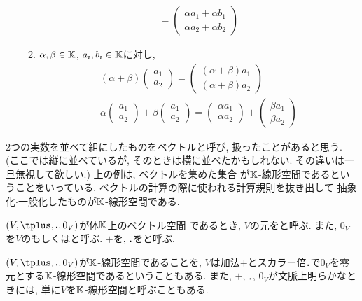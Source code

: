 \begin{example}
\begin{enumerate}
\begin{enumerate}
\begin{align*}
=\begin{pmatrix}\alpha a_1+\alpha b_1\\\alpha a_2+\alpha b_2\end{pmatrix}
\end{align*}
    \item
$\alpha,\beta\in\mathbb{K}$, $a_i,b_i\in\mathbb{K}$に対し,
    \begin{align*}
(\alpha+\beta)\begin{pmatrix}a_1\\a_2\end{pmatrix}
=\begin{pmatrix}(\alpha+\beta)a_1\\(\alpha+\beta)a_2\end{pmatrix}\\
\alpha\begin{pmatrix}a_1\\a_2\end{pmatrix}+\beta\begin{pmatrix}a_1\\a_2\end{pmatrix}
=\begin{pmatrix}\alpha a_1\\\alpha a_2\end{pmatrix}+\begin{pmatrix}\beta a_1\\\beta a_2\end{pmatrix}
\end{align*}
    \end{enumerate}
  \end{enumerate}
  
\end{example}


2つの実数を並べて組にしたものをベクトルと呼び, 扱ったことがあると思う.
(ここでは縦に並べているが, そのときは横に並べたかもしれない. その違いは一旦無視して欲しい.)
上の例は,
ベクトルを集めた集合
が$\mathbb{K}$-線形空間であるということをいっている.
ベクトルの計算の際に使われる計算規則を抜き出して
抽象化$\cdot$一般化したものが$\mathbb{K}$-線形空間である.

 $(V,\plus,\act ,0_V)$が体$\mathbb{K}$上のベクトル空間
  であるとき,
  $V$の元をと呼ぶ.
  また, $0_V$を$V$のもしくはと呼ぶ.
  $\plus$を,
  $\mathbin{\boldsymbol{.}} $をと呼ぶ.


\begin{remark}
  $(V,\plus,\act ,0_V)$が$\mathbb{K}$-線形空間であることを,
  $V$は加法$\plus$とスカラー倍$\mathbin{\boldsymbol{.}} $で$0_V$を零元とする$\mathbb{K}$-線形空間であるということもある.
  また, $\plus$, $\mathbin{\boldsymbol{.}} $, $0_V$が文脈上明らかなときには,
  単に$V$を$\mathbb{K}$-線形空間と呼ぶこともある.
\end{remark}

